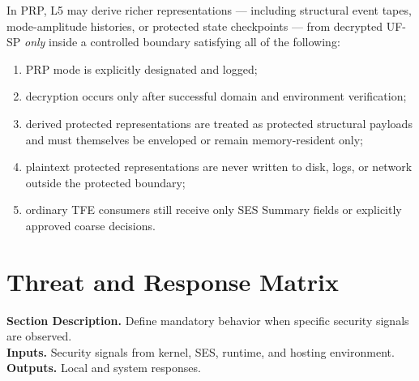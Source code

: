 \documentclass[11pt]{report}
\newcommand{\meta}[3]{\textbf{Section Description.} #1\\
\textbf{Inputs.} #2\\
\textbf{Outputs.} #3\par}
\begin{document}
In PRP, L5 may derive richer representations --- including structural event tapes, mode-amplitude histories, or protected state checkpoints --- from decrypted UF-SP \emph{only} inside a controlled boundary satisfying all of the following:
\begin{enumerate}[leftmargin=1.2cm]
    \item PRP mode is explicitly designated and logged;
    \item decryption occurs only after successful domain and environment verification;
    \item derived protected representations are treated as protected structural payloads and must themselves be enveloped or remain memory-resident only;
    \item plaintext protected representations are never written to disk, logs, or network outside the protected boundary;
    \item ordinary TFE consumers still receive only SES Summary fields or explicitly approved coarse decisions.
\end{enumerate}

\section{Threat and Response Matrix}
\meta{Define mandatory behavior when specific security signals are observed.}{Security signals from kernel, SES, runtime, and hosting environment.}{Local and system responses.}
\end{document}
